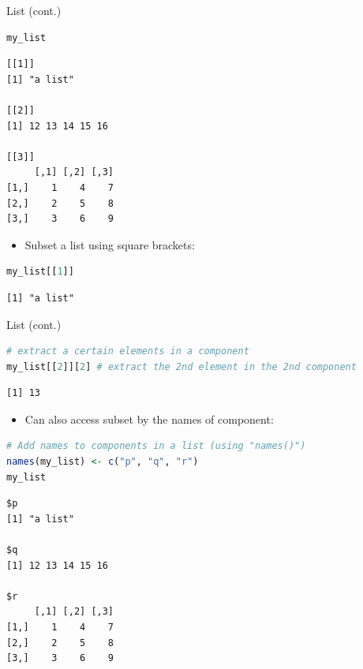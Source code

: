 \begin{frame}[fragile]{List (cont.)}
\begin{lstlisting}[language=R]
my_list
\end{lstlisting}
\begin{lstlisting}[style=output]
[[1]]
[1] "a list"

[[2]]
[1] 12 13 14 15 16

[[3]]
     [,1] [,2] [,3]
[1,]    1    4    7
[2,]    2    5    8
[3,]    3    6    9
\end{lstlisting}
\begin{itemize}
  \item Subset a list using square brackets:
\end{itemize}
\begin{lstlisting}[language=R]
my_list[[1]]
\end{lstlisting}
\begin{lstlisting}[style=output]
[1] "a list"
\end{lstlisting}
\end{frame}

\begin{frame}[fragile]{List (cont.)}
\begin{lstlisting}[language=R]
# extract a certain elements in a component
my_list[[2]][2] # extract the 2nd element in the 2nd component
\end{lstlisting}
\begin{lstlisting}[style=output]
[1] 13
\end{lstlisting}
\begin{itemize}
  \item Can also access subset by the names of component:
\end{itemize}
\begin{lstlisting}[language=R]
# Add names to components in a list (using "names()")
names(my_list) <- c("p", "q", "r")
my_list
\end{lstlisting}
\begin{lstlisting}[style=output]
$p
[1] "a list"

$q
[1] 12 13 14 15 16

$r
     [,1] [,2] [,3]
[1,]    1    4    7
[2,]    2    5    8
[3,]    3    6    9
\end{lstlisting}
\end{frame}

